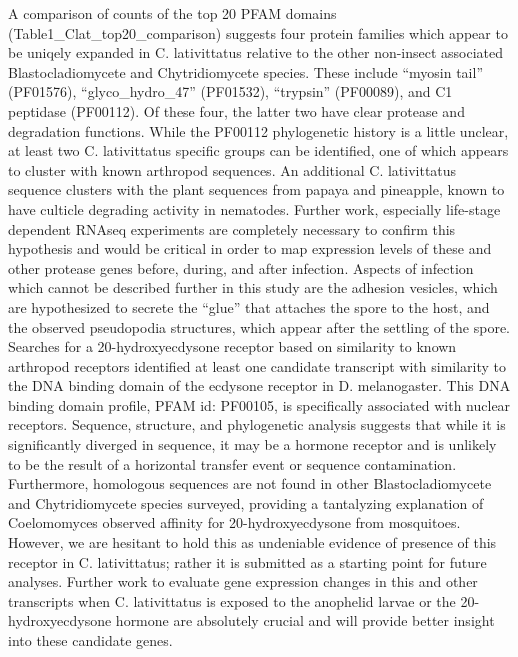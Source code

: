 \indent A comparison of counts of the top 20 PFAM domains (Table1\_Clat\_top20\_comparison) suggests four protein families which appear to be uniqely expanded in C. lativittatus relative to the other non-insect associated Blastocladiomycete and Chytridiomycete species. These include “myosin tail” (PF01576), “glyco\_hydro\_47” (PF01532), “trypsin” (PF00089), and C1 peptidase (PF00112). Of these four, the latter two have clear protease and degradation functions. While the PF00112 phylogenetic history is a little unclear, at least two C. lativittatus specific groups can be identified, one of which appears to cluster with known arthropod sequences. An additional C. lativittatus sequence clusters with the plant sequences from papaya and pineapple, known to have culticle degrading activity in nematodes. Further work, especially life-stage dependent RNAseq experiments are completely necessary to confirm this hypothesis and would be critical in order to map expression levels of these and other protease genes before, during, and after infection. Aspects of infection which cannot be described further in this study are the adhesion vesicles, which are hypothesized to secrete the “glue” that attaches the spore to the host, and the observed pseudopodia structures, which appear after the settling of the spore. \\
\indent Searches for a 20-hydroxyecdysone receptor based on similarity to known arthropod receptors identified at least one candidate transcript with similarity to the DNA binding domain of the ecdysone receptor in D. melanogaster. This DNA binding domain profile, PFAM id: PF00105, is specifically associated with nuclear receptors. Sequence, structure, and phylogenetic analysis suggests that while it is significantly diverged in sequence, it may be a hormone receptor and is unlikely to be the result of a horizontal transfer event or sequence contamination. Furthermore, homologous sequences are not found in other Blastocladiomycete and Chytridiomycete species surveyed, providing a tantalyzing explanation of Coelomomyces observed affinity for 20-hydroxyecdysone from mosquitoes. However, we are hesitant to hold this as undeniable evidence of presence of this receptor in C. lativittatus; rather it is submitted as a starting point for future analyses. Further work to evaluate gene expression changes in this and other transcripts when C. lativittatus is exposed to the anophelid larvae or the 20-hydroxyecdysone hormone are absolutely crucial and will provide better insight into these candidate genes. \\
